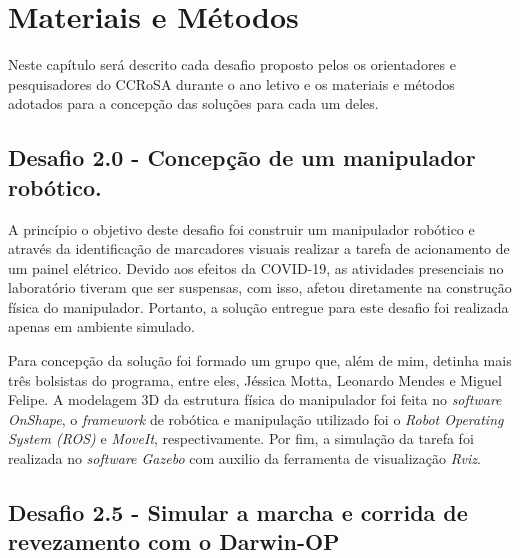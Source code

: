 \chapter{Materiais e Métodos}
\label{chap:mat}

Neste capítulo será descrito cada desafio proposto pelos os orientadores e pesquisadores do CCRoSA durante o ano letivo e os materiais e métodos adotados para a concepção das soluções para cada um deles.


\section{Desafio 2.0 - Concepção de um manipulador robótico.}
\label{sec:desafio2.0}

A princípio o objetivo deste desafio foi construir um manipulador robótico e através da identificação de marcadores visuais realizar a tarefa de acionamento de um painel elétrico. Devido aos efeitos da COVID-19, as atividades presenciais no laboratório tiveram que ser suspensas, com isso, afetou diretamente na construção física do manipulador. Portanto, a solução entregue para este desafio foi realizada apenas em ambiente simulado. 

Para concepção da solução foi formado um grupo que, além de mim, detinha mais três bolsistas do programa, entre eles, Jéssica Motta, Leonardo Mendes e Miguel Felipe. A modelagem 3D da estrutura física do manipulador foi feita no \textit{software OnShape}, o \textit{framework} de robótica e manipulação utilizado foi o \textit{Robot Operating System (ROS)} e \textit{MoveIt}, respectivamente. Por fim, a simulação da tarefa foi realizada no \textit{software Gazebo} com auxilio da ferramenta de visualização \textit{Rviz}.

\section{Desafio 2.5 - Simular a marcha e corrida de revezamento com o Darwin-OP}
\label{sec:desafio2.5}